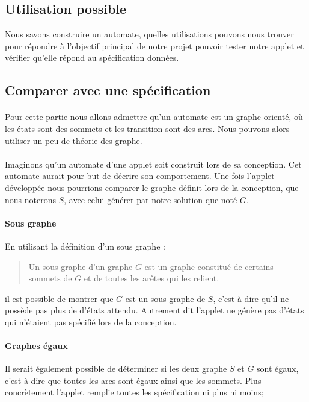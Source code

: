 \subsection{Utilisation possible}

Nous savons construire un automate, quelles utilisations pouvons nous trouver 
pour répondre à l'objectif principal de notre projet pouvoir tester notre 
applet et vérifier qu'elle répond au spécification données.

\subsection{Comparer avec une spécification}

\paragraph{}
Pour cette partie nous allons admettre qu'un automate est un graphe orienté, où 
les états sont des sommets et les transition sont des arcs. Nous pouvons alors 
utiliser un peu de théorie des graphe.

\paragraph{}
Imaginons qu'un automate d'une applet soit construit lors de sa conception. Cet 
automate aurait pour but de décrire son comportement. Une fois l'applet 
développée nous pourrions comparer le graphe définit lors 
de la conception, que nous noterons $S$, avec celui générer par notre solution 
que noté $G$.

\paragraph{Sous graphe}
En utilisant la définition d'un sous graphe \cite{th_graph}:

\begin{quote}
 Un sous graphe d’un graphe $G$ est un graphe constitué de certains sommets de 
$G$ et de toutes les arêtes qui les relient.
\end{quote}


il est possible de montrer que $G$ est un sous-graphe de $S$, c'est-à-dire 
qu'il ne possède pas plus de d'états attendu. Autrement dit l'applet ne génère 
pas d'états qui n'étaient pas spécifié lors de la conception.

\paragraph{Graphes égaux}
Il serait également possible de déterminer si les deux graphe $S$ et $G$ sont 
égaux, c'est-à-dire que toutes les arcs sont égaux ainsi que les sommets. Plus 
concrètement l'applet remplie toutes les spécification ni plus ni moins;

